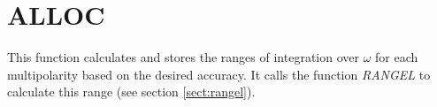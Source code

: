 \section{ALLOC}
\label{sect:alloc}

\noindent This function calculates and stores the ranges of integration over
$\omega$ for each multipolarity based on the desired accuracy. It calls the
function {\em RANGEL} to calculate this range (see section
\ref{sect:rangel}).\\

